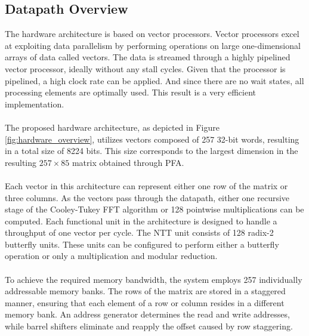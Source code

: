 \documentclass[english,master=eelt,masteroption=ec]{kulemt}
\begin{document}
\subsection{Datapath Overview}
The hardware architecture is based on vector processors. Vector processors excel at exploiting data parallelism by performing operations on large one-dimensional arrays of data called vectors. The data is streamed through a highly pipelined vector processor, ideally without any stall cycles. Given that the processor is pipelined, a high clock rate can be applied. And since there are no wait states, all processing elements are optimally used. This result is a very efficient implementation.
\\\\
The proposed hardware architecture, as depicted in Figure \ref{fig:hardware_overview}, utilizes vectors composed of 257 32-bit words, resulting in a total size of 8224 bits. This size corresponds to the largest dimension in the resulting $257 \times 85$ matrix obtained through PFA.
\\\\
Each vector in this architecture can represent either one row of the matrix or three columns. As the vectors pass through the datapath, either one recursive stage of the Cooley-Tukey FFT algorithm or 128 pointwise multiplications can be computed. Each functional unit in the architecture is designed to handle a throughput of one vector per cycle. The NTT unit consists of 128 radix-2 butterfly units. These units can be configured to perform either a butterfly operation or only a multiplication and modular reduction.
\\\\
To achieve the required memory bandwidth, the system employs 257 individually addressable memory banks. The rows of the matrix are stored in a staggered manner, ensuring that each element of a row or column resides in a different memory bank. An address generator determines the read and write addresses, while barrel shifters eliminate and reapply the offset caused by row staggering.
\end{document}
